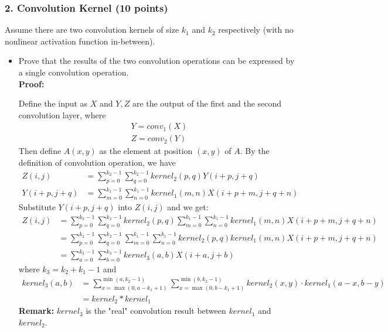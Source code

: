 \documentclass[12pt]{article}%
\begin{document}
    \newpage


    \subsubsection*{2. Convolution Kernel (10 points)}
    Assume there are two convolution kernels of size
    $k_1$ and $k_2$ respectively (with no nonlinear activation function in-between).
    \begin{itemize}
        \item Prove that the results of the two convolution operations can be expressed by a single convolution operation.\\
        {\bf Proof:}
        \par Define the input as $X$ and $Y,Z$ are the output of the first and the second convolution layer, where
        \begin{align*}
            Y = conv_1(X)\\
            Z = conv_2(Y)
        \end{align*}
        Then define $A(x,y)$ as the element at position $(x,y)$ of $A$.
        By the definition of convolution operation, we have
        \begin{align*}
            Z(i,j) &= \sum_{p=0}^{k_2-1}\sum_{q=0}^{k_2-1}kernel_2(p,q)Y(i+p,j+q)\\
            Y(i+p,j+q) &= \sum_{m=0}^{k_1-1}\sum_{n=0}^{k_1-1}kernel_1(m,n)X(i+p+m,j+q+n)
        \end{align*}
        Substitute $Y(i+p,j+q)$ into $Z(i,j)$ and we get:
        \begin{align*}
            Z(i,j) &= \sum_{p=0}^{k_2-1}\sum_{q=0}^{k_2-1}kernel_2(p,q)\sum_{m=0}^{k_1-1}\sum_{n=0}^{k_1-1}kernel_1(m,n)X(i+p+m,j+q+n)\\
            &= \sum_{p=0}^{k_2-1}\sum_{q=0}^{k_2-1}\sum_{m=0}^{k_1-1}\sum_{n=0}^{k_1-1}kernel_2(p,q)kernel_1(m,n)X(i+p+m,j+q+n)\\
            &= \sum_{a=0}^{k_3-1}\sum_{b=0}^{k_3-1}kernel_3(a,b)X(i+a,j+b)
        \end{align*}
        where $k_3 = k_2+k_1-1$ and
        \begin{align*}
            kernel_3(a, b) &= \sum_{x=\max(0,a-k_1+1)}^{\min(a,k_2-1)}\sum_{x=\max(0,b-k_1+1)}^{\min(b,k_2-1)}kernel_2(x,y)\cdot kernel_1(a-x,b-y)\\
            &= kernel_2 * kernel_1
        \end{align*}
        {\bf Remark:} $kernel_3$ is the "real" convolution result between $kernel_1$ and $kernel_2$.

\end{itemize}
\end{document}
